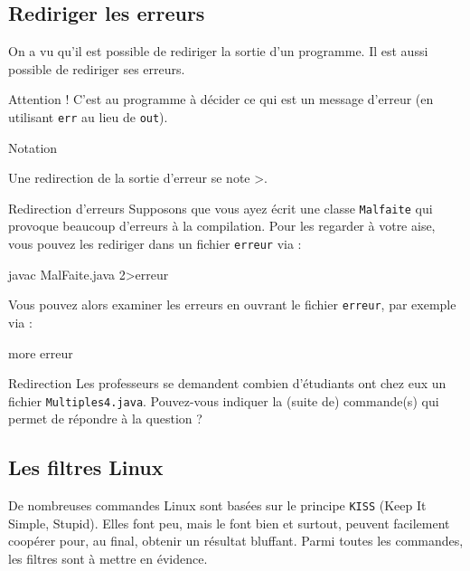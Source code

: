 \documentclass[a4paper,11pt]{article}
\begin{document}
	\subsection{Rediriger les erreurs}  
          	On a vu qu'il est possible de rediriger la sortie d'un programme.
		Il est aussi possible de rediriger ses erreurs.
				
          	Attention ! C'est au programme \`a d\'ecider ce qui est un message d'erreur (en utilisant
		\verb_err_ au lieu de \verb_out_).
			
		\begin{coltbox}{Notation}
		
					Une redirection de la sortie d'erreur se note >\guillemotright .
				
		\end{coltbox}
\newpage
			
		\begin{Exemple}{Redirection d'erreurs}
			Supposons que vous ayez \'ecrit une classe \verb_Malfaite_ qui provoque beaucoup d'erreurs \`a la compilation.
			Pour les regarder \`a votre aise, vous pouvez les rediriger dans un fichier 
					\verb_erreur_ via :
					\begin{Console}
						javac MalFaite.java 2>erreur
						
					\end{Console}
					Vous pouvez alors examiner les erreurs en ouvrant le fichier \verb_erreur_,
					par exemple via : 
					\begin{Console} 
						more erreur
					\end{Console}
					
		\end{Exemple}		
          	
		\begin{Exercice}{Redirection}        
			Les professeurs se demandent combien d'\'etudiants ont chez eux
			un fichier \verb_Multiples4.java_. Pouvez-vous indiquer la (suite de) commande(s)
			qui permet de r\'epondre \`a la question ?
		\end{Exercice}
				
            \par
        \subsection{Les filtres Linux}  
      		De nombreuses commandes Linux sont bas\'ees sur le principe \verb_KISS_ (Keep It Simple, Stupid).
		Elles font peu, mais le font bien et surtout, peuvent facilement coop\'erer pour, au final,
		obtenir un r\'esultat bluffant. Parmi toutes les commandes, les filtres sont \`a mettre en \'evidence.
	
\end{document}
